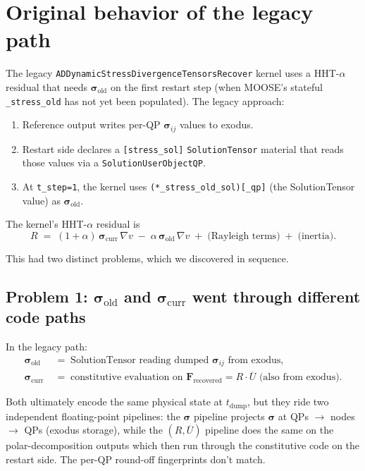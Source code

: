 \documentclass[11pt]{article}
\newcommand{\F}{\mathbf{F}}
\newcommand{\sig}{\boldsymbol{\sigma}}
\begin{document}
\section{Original behavior of the legacy path}

The legacy \texttt{ADDynamicStressDivergenceTensorsRecover} kernel uses a HHT-$\alpha$ residual that needs $\sig_{\text{old}}$ on the first restart step (when MOOSE's stateful \texttt{\_stress\_old} has not yet been populated). The legacy approach:

\begin{enumerate}
\item Reference output writes per-QP $\sig_{ij}$ values to exodus.
\item Restart side declares a \texttt{[stress\_sol]} \texttt{SolutionTensor} material that reads those values via a \texttt{SolutionUserObjectQP}.
\item At \texttt{t\_step=1}, the kernel uses \texttt{(*\_stress\_old\_sol)[\_qp]} (the SolutionTensor value) as $\sig_{\text{old}}$.
\end{enumerate}

The kernel's HHT-$\alpha$ residual is
\begin{equation}
R \;=\; (1+\alpha)\,\sig_{\text{curr}}\,\nabla v \;-\; \alpha\,\sig_{\text{old}}\,\nabla v \;+\; \text{(Rayleigh terms)} \;+\; \text{(inertia)}.
\label{eq:residual}
\end{equation}

This had two distinct problems, which we discovered in sequence.

\subsection{Problem 1: $\sig_{\text{old}}$ and $\sig_{\text{curr}}$ went through different code paths}

In the legacy path:
\begin{align*}
\sig_{\text{old}} &\;=\; \text{SolutionTensor reading dumped } \sig_{ij} \text{ from exodus,} \\
\sig_{\text{curr}} &\;=\; \text{constitutive evaluation on } \F_{\text{recovered}} = R \cdot \overline{U} \text{ (also from exodus)}.
\end{align*}

Both ultimately encode the same physical state at $t_{\text{dump}}$, but they ride two independent floating-point pipelines: the $\sig$ pipeline projects $\sig$ at QPs $\to$ nodes $\to$ QPs (exodus storage), while the $(R, \overline{U})$ pipeline does the same on the polar-decomposition outputs which then run through the constitutive code on the restart side. The per-QP round-off fingerprints don't match.
\end{document}
